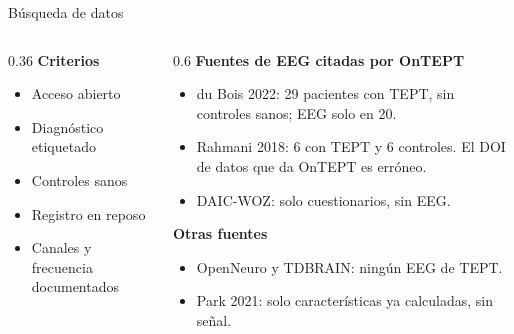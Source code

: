 \documentclass[aspectratio=169,11pt]{beamer}
\begin{document}
\begin{frame}{Búsqueda de datos}
  \begin{columns}[T]
    \begin{column}{0.36\textwidth}
      \textbf{Criterios}
      \begin{itemize}\small
        \item Acceso abierto
        \item Diagnóstico etiquetado
        \item Controles sanos
        \item Registro en reposo
        \item Canales y frecuencia documentados
      \end{itemize}
    \end{column}
    \begin{column}{0.6\textwidth}
      \textbf{Fuentes de EEG citadas por OnTEPT}
      \begin{itemize}\small
        \item du Bois 2022: 29 pacientes con TEPT, \alert{sin controles sanos}; EEG solo en 20.
        \item Rahmani 2018: 6 con TEPT y 6 controles. \alert{El DOI de datos que da OnTEPT es erróneo.}
        \item DAIC-WOZ: solo cuestionarios, sin EEG.
      \end{itemize}
      \textbf{Otras fuentes}
      \begin{itemize}\small
        \item OpenNeuro y TDBRAIN: ningún EEG de TEPT.
        \item Park 2021: solo características ya calculadas, sin señal.
      \end{itemize}
    \end{column}
  \end{columns}
\end{frame}
\end{document}
